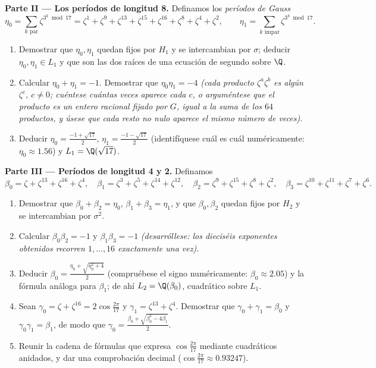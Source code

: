 \begin{problem}
\medskip
\noindent\textbf{Parte II --- Los períodos de longitud 8.} Definamos los
\emph{períodos de Gauss}
\[
\eta_0 = \sum_{k \text{ par}} \zeta^{3^k \bmod 17}
= \zeta^{1} + \zeta^{9} + \zeta^{13} + \zeta^{15} + \zeta^{16} +
\zeta^{8} + \zeta^{4} + \zeta^{2},
\qquad
\eta_1 = \sum_{k \text{ impar}} \zeta^{3^k \bmod 17}.
\]
\begin{enumerate}[resume]
  \item Demostrar que $\eta_0, \eta_1$ quedan fijos por $H_1$ y se
  intercambian por $\sigma$; deducir $\eta_0, \eta_1 \in L_1$ y que son
  las dos raíces de una ecuación de segundo  sobre $\Q$. \item
  Calcular $\eta_0 + \eta_1 = -1$. Demostrar que $\eta_0\eta_1 = -4$
  \emph{(cada producto $\zeta^a\zeta^b$ es algún $\zeta^c$, $c \neq 0$;
  cuéntese cuántas veces aparece cada $c$, o arguméntese que el producto
  es un entero racional fijado por $G$, igual a la suma de los $64$
  productos, y úsese que cada resto no nulo aparece el mismo número de
  veces)}. \item Deducir $\eta_0 = \frac{-1 + \sqrt{17}}2$, $\eta_1 =
        \frac{-1-\sqrt{17}}2$ (identifíquese cuál es cuál numéricamente:
  $\eta_0 \approx 1.56$) y $L_1 =
        \Q(\sqrt{17})$.
\end{enumerate}

\medskip
\noindent\textbf{Parte III --- Períodos de longitud 4 y 2.} Definamos
\[
\beta_0 = \zeta + \zeta^{13} + \zeta^{16} + \zeta^{4},\quad
\beta_1 = \zeta^3 + \zeta^5 + \zeta^{14} + \zeta^{12},\quad
\beta_2 = \zeta^9 + \zeta^{15} + \zeta^{8} + \zeta^{2},\quad
\beta_3 = \zeta^{10} + \zeta^{11} + \zeta^{7} + \zeta^{6}.
\]
\begin{enumerate}[resume]
  \item Demostrar que $\beta_0 + \beta_2 = \eta_0$, $\beta_1 + \beta_3 =
        \eta_1$, y que $\beta_0, \beta_2$ quedan fijos por $H_2$ y se
  intercambian por $\sigma^2$. \item Calcular $\beta_0\beta_2 = -1$ y
  $\beta_1\beta_3 = -1$ \emph{(desarróllese: los dieciséis exponentes
  obtenidos recorren $1, \dots, 16$ exactamente una vez)}. \item Deducir
  $\beta_0 = \frac{\eta_0 + \sqrt{\eta_0^2 + 4}}2$ (compruébese el signo
  numéricamente: $\beta_0 \approx 2.05$) y la fórmula análoga para
  $\beta_1$; de ahí $L_2 =
        \Q(\beta_0)$, cuadrático sobre $L_1$. \item Sean
  $\gamma_0 = \zeta + \zeta^{16} =
        2\cos\frac{2\pi}{17}$ y $\gamma_1 = \zeta^{13} +
        \zeta^4$. Demostrar que $\gamma_0 + \gamma_1 = \beta_0$ y
  $\gamma_0\gamma_1 = \beta_1$, de modo que $\gamma_0 =
        \frac{\beta_0 + \sqrt{\beta_0^2 - 4\beta_1}}2$. \item Reunir la
  cadena de fórmulas que expresa $\cos\frac{2\pi}{17}$ mediante
   cuadráticos anidados, y dar una comprobación decimal
  ($\cos\frac{2\pi}{17} \approx 0.93247$).
\end{enumerate}


\end{problem}
